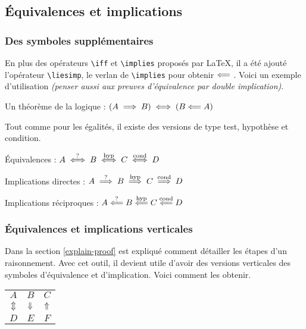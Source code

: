 \documentclass[12pt,a4paper]{article}
\theoremstyle{definition}
\begin{document}

    \subsection{Équivalences et implications}

	    \subsubsection{Des symboles supplémentaires}

En plus des opérateurs \verb+\iff+ et \verb+\implies+ proposés par \LaTeX{}, il a été ajouté l'opérateur \verb+\liesimp+, le verlan de \verb+\implies+ pour obtenir $\mathrel{\Longleftarrow}$ . Voici un exemple d'utilisation \emph{(penser aussi aux preuves d'équivalence par double implication)}.

\begin{tcblisting}{}
Un théorème de la logique : $(A \implies B) \iff (B \liesimp A)$
\end{tcblisting}


Tout comme pour les égalités, il existe des versions de type test, hypothèse et condition.

\begin{tcblisting}{}
Équivalences : $A \ifftest B \iffhyp C \iffcond D$

Implications directes : $A \impliestest B \implieshyp C \impliescond D$

Implications réciproques : $A \liesimptest B \liesimphyp C \liesimpcond D$
\end{tcblisting}


    	\subsubsection{Équivalences et implications verticales}

Dans la section \ref{explain-proof} est expliqué comment détailler les étapes d'un raisonnement. Avec cet outil, il devient utile d'avoir des versions verticales des symboles d'équivalence et d'implication. Voici comment les obtenir.

\begin{tcblisting}{}
\begin{tabular}{ccc}
    $A$       &   $B$           &   $C$         \\
    $\viff$   &   $\vimplies$   &   $\vliesimp$ \\
    $D$       &   $E$           &   $F$
\end{tabular}
\end{tcblisting}
\end{document}

